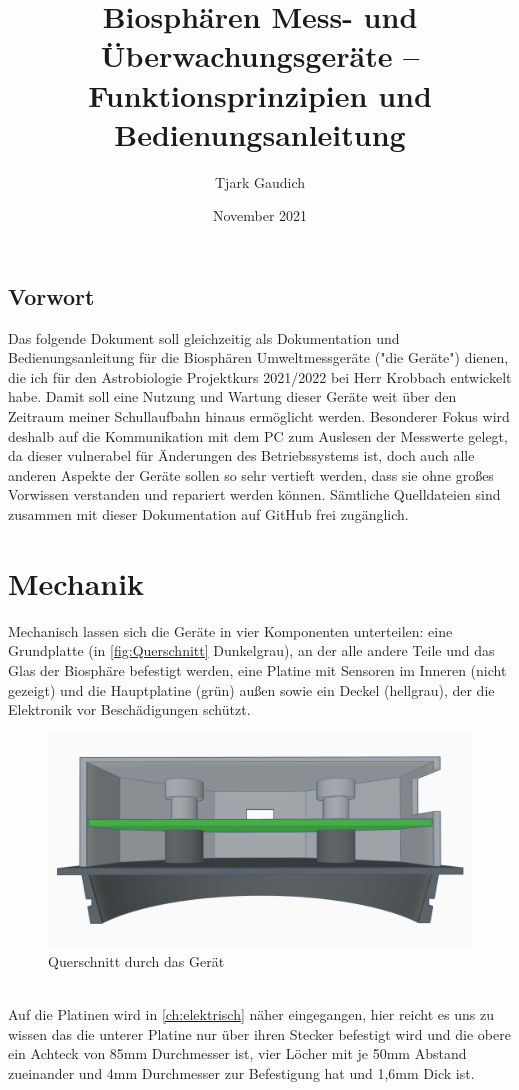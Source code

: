 \documentclass[12pt, a4paper, oneside]{report}
\title{\textbf{Biosphären Mess- und Überwachungsgeräte -- Funktionsprinzipien und Bedienungsanleitung}}
\author{Tjark Gaudich}
\date{November 2021}
\begin{document}
\maketitle

\section{Vorwort}
Das folgende Dokument soll gleichzeitig als Dokumentation und Bedienungsanleitung für die Biosphären Umweltmessgeräte ("die Geräte") dienen, die ich für den Astrobiologie Projektkurs 2021/2022 bei Herr Krobbach entwickelt habe. Damit soll eine Nutzung und Wartung dieser Geräte weit über den Zeitraum meiner Schullaufbahn hinaus ermöglicht werden. Besonderer Fokus wird deshalb auf die Kommunikation mit dem PC zum Auslesen der Messwerte gelegt, da dieser vulnerabel für Änderungen des Betriebssystems ist, doch auch alle anderen Aspekte der Geräte sollen so sehr vertieft werden, dass sie ohne großes Vorwissen verstanden und repariert werden können. Sämtliche Quelldateien sind zusammen mit dieser Dokumentation auf 
GitHub\cite{Github} frei zugänglich.
\tableofcontents
\listoffigures

\chapter{Mechanik}

Mechanisch lassen sich die Geräte in vier Komponenten unterteilen:
eine Grundplatte (in \autoref{fig:Querschnitt} Dunkelgrau), an der alle andere Teile und das Glas der Biosphäre befestigt werden, eine Platine mit Sensoren im Inneren (nicht gezeigt) und die Hauptplatine (grün) außen sowie ein Deckel (hellgrau), der die Elektronik vor Beschädigungen schützt.
\begin{figure}[h]
	\centering
	\includegraphics[width=1\textwidth]{Querschnitt}
	\caption{Querschnitt durch das Gerät}
	\label{fig:Querschnitt}
\end{figure}
\\Auf die Platinen wird in \autoref{ch:elektrisch} näher eingegangen, hier reicht es uns zu wissen das die unterer Platine nur über ihren Stecker befestigt wird und die obere ein Achteck von 85mm Durchmesser ist, vier Löcher mit je 50mm Abstand zueinander und 4mm Durchmesser zur Befestigung hat und 1,6mm Dick ist.
\end{document}
